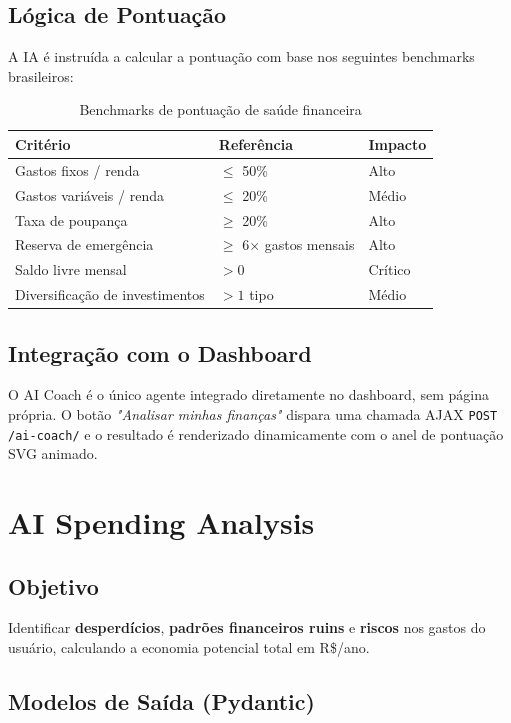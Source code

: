 \documentclass[12pt, a4paper, oneside]{report}
\begin{document}
\subsection{Lógica de Pontuação}

A IA é instruída a calcular a pontuação com base nos seguintes benchmarks brasileiros:

\begin{table}[H]
\centering
\caption{Benchmarks de pontuação de saúde financeira}
\begin{tabularx}{\textwidth}{X l l}
\toprule
Critério & Referência & Impacto \\
\midrule
Gastos fixos / renda & $\leq$ 50\% & Alto \\
Gastos variáveis / renda & $\leq$ 20\% & Médio \\
Taxa de poupança & $\geq$ 20\% & Alto \\
Reserva de emergência & $\geq$ 6$\times$ gastos mensais & Alto \\
Saldo livre mensal & $> 0$ & Crítico \\
Diversificação de investimentos & $> 1$ tipo & Médio \\
\bottomrule
\end{tabularx}
\end{table}

\subsection{Integração com o Dashboard}

O AI Coach é o único agente integrado diretamente no dashboard, sem página própria. O botão \textit{"Analisar minhas finanças"} dispara uma chamada AJAX \texttt{POST /ai-coach/} e o resultado é renderizado dinamicamente com o anel de pontuação SVG animado.

\section{AI Spending Analysis}

\subsection{Objetivo}

Identificar \textbf{desperdícios}, \textbf{padrões financeiros ruins} e \textbf{riscos} nos gastos do usuário, calculando a economia potencial total em R\$/ano.

\subsection{Modelos de Saída (Pydantic)}
\end{document}
